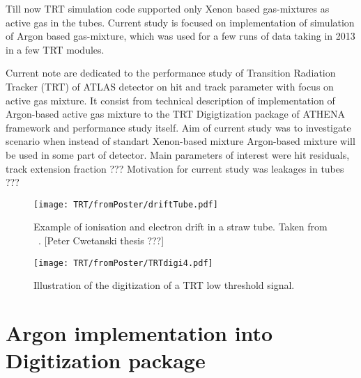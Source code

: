 Till now TRT simulation code supported only Xenon based gas-mixtures as active gas in the tubes. 
Current study is focused on implementation of simulation of Argon based gas-mixture, 
which was used for a few runs of data taking in 2013 in a few TRT modules.


Current note are dedicated to the performance study of Transition Radiation Tracker (TRT) of ATLAS detector on hit and track parameter with focus on active gas mixture.
It consist from technical description of implementation of Argon-based active gas mixture to the TRT Digigtization package of ATHENA framework and performance study itself. 
Aim of current study was to investigate scenario when instead of standart Xenon-based mixture Argon-based mixture will be used in some part of detector. Main parameters of interest
were hit residuals, track extension fraction ???
Motivation for current study was leakages in tubes ???





\begin{figure}
\begin{center}
 \texttt{[image: TRT/fromPoster/driftTube.pdf]}
\caption{\label{fig:clusterDriftInTube} Example of ionisation and electron drift in a straw tube. Taken from ~\cite{Cwetanski:962570}. 
	  [Peter Cwetanski thesis ???]}
\end{center}
\end{figure}

\begin{figure}
\begin{center}
 \texttt{[image: TRT/fromPoster/TRTdigi4.pdf]}
\caption{\label{fig:pulseDigitization} Illustration of the digitization of a TRT low threshold signal.}
\end{center}
\end{figure}



\section{Argon implementation into Digitization package}
\label{sec:TRT:argonImpl}


